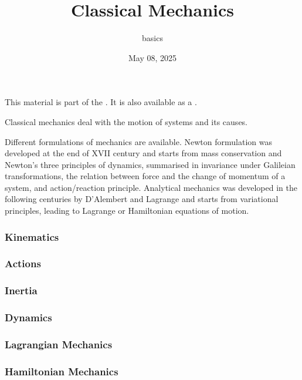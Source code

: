 \documentclass[letterpaper,10pt,english]{jupyterBook}
\title{Classical Mechanics}
\date{May 08, 2025}
\author{basics}
\begin{document}
\pagestyle{empty}
\sphinxmaketitle
\pagestyle{plain}
\sphinxtableofcontents
\pagestyle{normal}
\label{\detokenize{intro::doc}}


\sphinxAtStartPar
This material is part of the . It is also available as a .

\sphinxAtStartPar
Classical mechanics deal with the motion of systems and its causes.

\sphinxAtStartPar
Different formulations of mechanics are available. Newton formulation was developed at the end of XVII century and starts from mass conservation and Newton’s three principles of dynamics, summarised in invariance under Galileian transformations, the relation between force and the change of momentum of a system, and action/reaction principle. Analytical mechanics was developed in the following centuries by D’Alembert and Lagrange and starts from variational principles, leading to Lagrange or Hamiltonian equations of motion.

\sphinxAtStartPar
{}
\subsubsection*{Kinematics}
\subsubsection*{Actions}
\subsubsection*{Inertia}
\subsubsection*{Dynamics}

\sphinxAtStartPar
{}
\subsubsection*{Lagrangian Mechanics}
\subsubsection*{Hamiltonian Mechanics}
\end{document}

